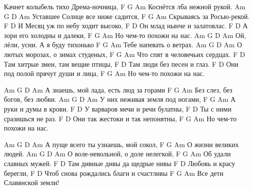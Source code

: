  
 

Качнет колыбель тихо Дрема-ночница,
F G Am
Коснётся лба нежной рукой.
Am G D Am
Уставшее Солнце все ниже садится,
F G Am
Скрываясь за Росью-рекой.
F D
И Месяц уж по небу ходит высоко,
F D
Он млад нынче и залатовлас.
F D
А зори его холодны и далеки,
F G Am
Но чем-то похожи на нас.
Am G D Am
Ой, лёли, усни. А я буду тихонько
F G Am
Тебе напевать о ветрах.
Am G D Am
О лютых морозах, о зимах студеных,
F G Am
Что спят в человечьих сердцах.
F D
Там хитрые змеи, там вещие птицы,
F D
Там люди без песен и глаз.
F D
Они под полой прячут души и лица,
F G Am
Но чем-то похожи на нас.

Am G D Am
А знаешь, мой лада, есть люд за горами
F G Am
Без слез, без богов, без любви.
Am G D Am
У них неживая земля под ногами,
F G Am
А руки и думы в крови.
F D
У варваров мечи и речи булатны,
F D
Ты с ними сразишься не раз.
F D
Они так жестоки и так непонятны,
F G Am
Но чем-то похожи на нас.

Am G D Am
А пуще всего ты узнаешь, мой сокол,
F G Am
О жизни великих людей.
Am G D Am
О воле-невольной, о доле нелегкой,
F G Am
Об удали славных мужей.
F D
Там дивные дивы да щедрые нивы
F D
Любовь и красу берегли,
F D
Чтоб снова рождались благи и счастливы
F G Am
Все дети Славянской земли!
